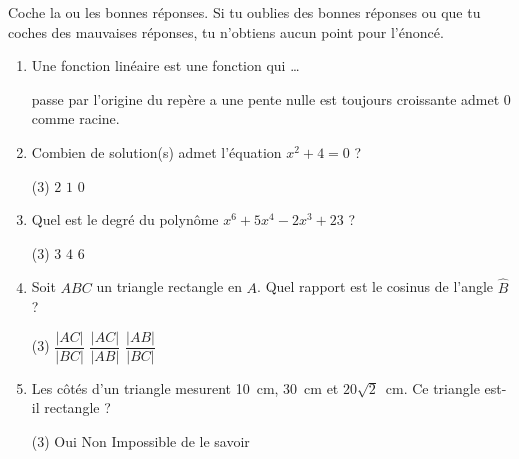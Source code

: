 %
%
    Coche la ou les bonnes réponses. Si tu oublies des bonnes réponses ou que tu coches des mauvaises réponses, tu n'obtiens aucun point pour l'énoncé.
    \begin{enumerate}
        \item Une fonction linéaire est une fonction qui \dots
              \begin{QCM}
                  \choice passe par l'origine du repère
                  \choice a une pente nulle
                  \choice est toujours croissante
                  \choice admet $0$ comme racine.
              \end{QCM}
        \item Combien de solution(s) admet l'équation $x^2+4=0$ ?
              \begin{QCM}(3)
                  \choice $2$
                  \choice $1$
                  \choice $0$
              \end{QCM}
        \item Quel est le degré du polynôme $x^6 + 5x^4 -2x^3 +23$ ?
              \begin{QCM}(3)
                  \choice $3$
                  \choice $4$
                  \choice $6$
              \end{QCM}
        \item Soit $ABC$ un triangle rectangle en $A$. Quel rapport est le cosinus de l'angle $\widehat{B}$ ?
              \begin{QCM}(3)
                  \choice $\dfrac{|AC|}{|BC|}$
                  \choice $\dfrac{|AC|}{|AB|}$
                  \choice $\dfrac{|AB|}{|BC|}$
              \end{QCM}
        \item Les côtés d'un triangle mesurent \SI{10}{cm}, \SI{30}{cm} et $20\sqrt{2}$~cm. Ce triangle est-il rectangle ?
              \begin{QCM}(3)
                  \choice Oui
                  \choice Non
                  \choice Impossible de le savoir
              \end{QCM}
    \end{enumerate}
